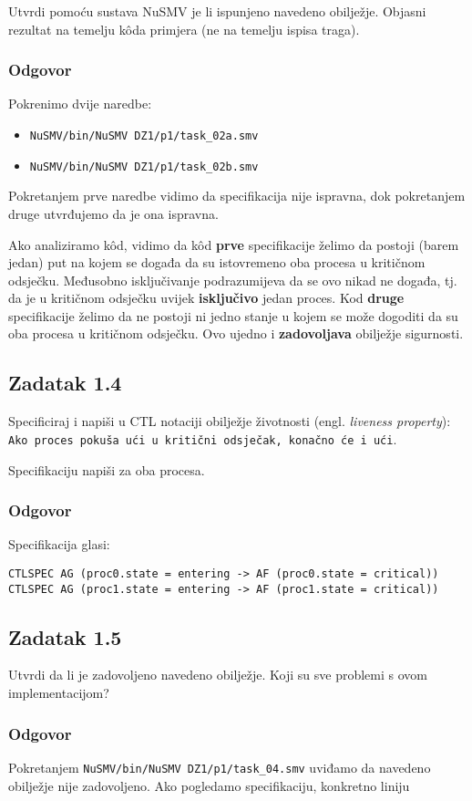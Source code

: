 \documentclass{article}
\newcommand{\zadatak}[1]{\subsection{Zadatak #1}}
\newcommand{\odgovor}{\subsubsection*{Odgovor}}
\newcommand{\code}[1]{\colorbox{blue!11}{\texttt{#1}}}
\begin{document}
Utvrdi pomoću sustava NuSMV je li ispunjeno navedeno obilježje. Objasni rezultat na temelju kôda primjera (ne na temelju ispisa traga).

\odgovor

Pokrenimo dvije naredbe:

\begin{itemize}
\item \code{NuSMV/bin/NuSMV DZ1/p1/task\_02a.smv}
\item \code{NuSMV/bin/NuSMV DZ1/p1/task\_02b.smv}
\end{itemize}

\noindent
Pokretanjem prve naredbe vidimo da specifikacija nije ispravna, dok pokretanjem druge utvrđujemo da je ona ispravna.
\newline

Ako analiziramo kôd, vidimo da kôd \textbf{prve} specifikacije želimo da postoji (barem jedan) put na kojem se događa da su istovremeno oba procesa u kritičnom odsječku. Međusobno isključivanje podrazumijeva da se ovo nikad ne događa, tj. da je u kritičnom odsječku uvijek \textbf{isključivo} jedan proces. Kod \textbf{druge} specifikacije želimo da ne postoji ni jedno stanje u kojem se može dogoditi da su oba procesa u kritičnom odsječku. Ovo ujedno i \textbf{zadovoljava} obilježje sigurnosti.
\pagebreak  %


\zadatak{1.4}

Specificiraj i napiši u CTL notaciji obilježje životnosti (engl. \textit{liveness property}):\newline
\code{Ako proces pokuša ući u kritični odsječak, konačno će i ući}.
\newline

\noindent
Specifikaciju napiši za oba procesa. 

\odgovor

Specifikacija glasi:

\begin{verbatim}
CTLSPEC AG (proc0.state = entering -> AF (proc0.state = critical))
CTLSPEC AG (proc1.state = entering -> AF (proc1.state = critical))
\end{verbatim}


\zadatak{1.5}

Utvrdi da li je zadovoljeno navedeno obilježje. Koji su sve problemi s ovom implementacijom?

\odgovor

Pokretanjem \code{NuSMV/bin/NuSMV DZ1/p1/task\_04.smv} uviđamo da navedeno obilježje nije zadovoljeno. Ako pogledamo specifikaciju, konkretno liniju
\end{document}
